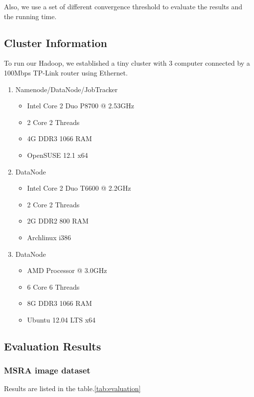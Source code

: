 \documentclass[a4paper,11pt]{article}
\begin{document}
Also, we use a set of different convergence threshold to evaluate the results
and the running time.

\subsection{Cluster Information}
To run our Hadoop, we established a tiny cluster with 3 computer connected by 
a 100Mbps TP-Link router using Ethernet.
\begin{enumerate}
  \item Namenode/DataNode/JobTracker
  \begin{itemize}
    \item Intel Core 2 Duo P8700 @ 2.53GHz
    \item 2 Core 2 Threads
    \item 4G DDR3 1066 RAM
    \item OpenSUSE 12.1 x64
  \end{itemize}
  \item DataNode
  \begin{itemize}
    \item Intel Core 2 Duo T6600 @ 2.2GHz
    \item 2 Core 2 Threads
    \item 2G DDR2 800 RAM
    \item Archlinux i386
  \end{itemize}
  \item DataNode
  \begin{itemize}
    \item AMD Processor @ 3.0GHz 
    \item 6 Core 6 Threads
    \item 8G DDR3 1066 RAM
    \item Ubuntu 12.04 LTS x64
  \end{itemize}
\end{enumerate}
\subsection{Evaluation Results}
\subsubsection{MSRA image dataset}
Results are listed in the table.\ref{tab:evaluation}
\end{document}
